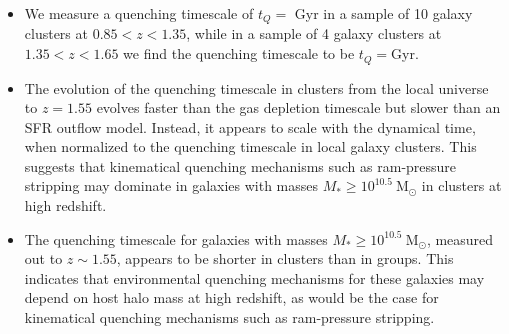 \begin{itemize}


\item
We measure a quenching timescale of $t_Q= $\gresult{} Gyr in a sample of 10 galaxy clusters at $0.85 < z < 1.35$, while in a sample of 4 galaxy clusters at $1.35 < z < 1.65$ we find the quenching timescale to be $t_Q=$\hiresult Gyr.

\item
The evolution of the quenching timescale in clusters from the local universe to $z=1.55$ evolves faster than the gas depletion timescale but slower than an SFR outflow model.
Instead, it appears to scale with the dynamical time, when normalized to the quenching timescale in local galaxy clusters.
This suggests that kinematical quenching mechanisms such as ram-pressure stripping may dominate in galaxies with masses $M_* \geq 10^{10.5}~ \mathrm{M}_\odot$ in clusters at high redshift.


\item
The quenching timescale for galaxies with masses $M_* \geq 10^{10.5}~ \mathrm{M}_\odot$, measured out to $z\sim1.55$, appears to be shorter in clusters than in groups.
This indicates that environmental quenching mechanisms for these galaxies may depend on host halo mass at high redshift, as would be the case for kinematical quenching mechanisms such as ram-pressure stripping.

\end{itemize}

